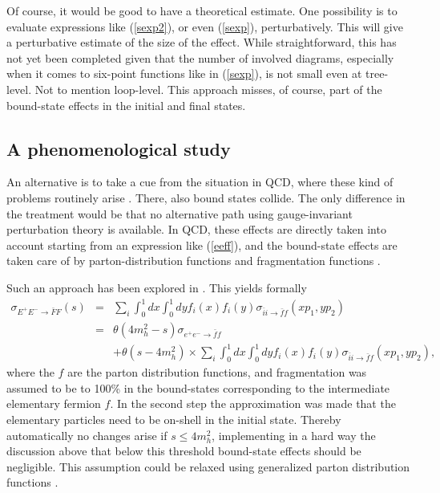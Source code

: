 \documentclass[final,12pt]{article}
\newcommand*{\no}{\noindent}
\newcommand*{\bea}{\begin{eqnarray}}
\newcommand*{\eea}{\end{eqnarray}}
\newcommand*{\pref}[1]{(\ref{#1})}
\newcommand*{\nn}{\nonumber}
\newcommand*{\1}{1\!\!\!\bot}
\begin{document}
Of course, it would be good to have a theoretical estimate. One possibility is to evaluate expressions like \pref{sexp2}, or even \pref{sexp}, perturbatively. This will give a perturbative estimate of the size of the effect. While straightforward, this has not yet been completed \cite{Maas:unpublished} given that the number of involved diagrams, especially when it comes to six-point functions like in \pref{sexp}, is not small even at tree-level. Not to mention loop-level. This approach misses, of course, part of the bound-state effects in the initial and final states.

\subsection{A phenomenological study}\label{ss:pheno}

An alternative is to take a cue from the situation in QCD, where these kind of problems routinely arise \cite{BeiglboCk:2006lfa,Bohm:2001yx,Dissertori:2003pj,Brodsky:2010an}. There, also bound states collide. The only difference in the treatment would be that no alternative path using gauge-invariant perturbation theory is available. In QCD, these effects are directly taken into account starting from an expression like \pref{eeff}, and the bound-state effects are taken care of by parton-distribution functions and fragmentation functions \cite{BeiglboCk:2006lfa,Bohm:2001yx,Dissertori:2003pj}.

Such an approach has been explored in \cite{Egger:2017tkd}. This yields formally
\bea
\sigma_{E^+E^-\to\bar{F}F}(s)&=&\sum_i\int_0^1 dx\int_0^1 dy f_i(x) f_i(y)\sigma_{\bar{i}i\to\bar{f}f}(xp_1,yp_2)\label{pdf}\\
&=&\theta(4m_h^2-s)\sigma_{e^+e^-\to\bar{f}f}\nn\\
&&+\theta(s-4m_h^2)\times\sum_i\int_0^1 dx\int_0^1 dy f_i(x) f_i(y)\sigma_{\bar{i}i\to\bar{f}f}(xp_1,yp_2)\nn,
\eea
\no where the $f$ are the parton distribution functions, and fragmentation was assumed to be to 100\% in the bound-states corresponding to the intermediate elementary fermion $f$. In the second step the approximation was made that the elementary particles need to be on-shell in the initial state. Thereby automatically no changes arise if $s\le 4m_h^2$, implementing in a hard way the discussion above that below this threshold bound-state effects should be negligible. This assumption could be relaxed using generalized parton distribution functions \cite{Lorce:2013pza,Diehl:2015uka}.
\end{document}
